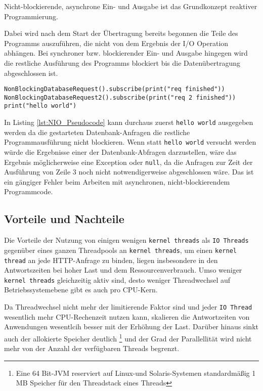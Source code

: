 Nicht-blockierende, asynchrone Ein- und Ausgabe ist das Grundkonzept reaktiver Programmierung.

Dabei wird nach dem Start der Übertragung bereits begonnen die Teile des Programms auszuführen, die nicht von dem Ergebnis der I/O Operation abhängen.
Bei synchroner bzw. blockierender Ein- und Ausgabe hingegen wird die restliche Ausführung des Programms blockiert
bis die Datenübertragung abgeschlossen ist.

\begin{lstlisting}[caption=Pseudocode Nonblocking I/O (NIO), captionpos=b, label=lst:NIO_Pseudocode]
NonBlockingDatabaseRequest().subscribe(print("req finished"))
NonBlockingDatabaseRequest2().subscribe(print("req 2 finished"))
print("hello world")
\end{lstlisting}
In Listing \ref{lst:NIO_Pseudocode} kann durchaus zuerst \verb|hello world| ausgegeben werden da die gestarteten Datenbank-Anfragen die
restliche Programmausführung nicht blockieren. Wenn statt \verb|hello world| versucht werden würde die Ergebnisse einer der Datenbank-Abfragen
darzustellen, wäre das Ergebnis möglicherweise eine Exception oder \verb|null|, da die Anfragen zur Zeit der Ausführung von Zeile 3 noch nicht notwendigerweise
abgeschlossen wäre. Das ist ein gängiger Fehler beim Arbeiten mit asynchronen, nicht-blockierendem Programmcode.

\subsection{Vorteile und Nachteile}
\label{subsec:vorteile_nachteile}

Die Vorteile der Nutzung von einigen wenigen \verb|kernel threads| als \verb|IO Threads| gegenüber eines ganzen Threadpools
an \verb|kernel threads|, um einen \verb|kernel thread| an jede HTTP-Anfrage zu binden, liegen insbesondere in den Antwortszeiten bei
hoher Last und dem Ressourcenverbrauch.
Umso weniger \verb|kernel threads| gleichzeitig aktiv sind, desto weniger Threadwechsel auf Betriebssystemebene
gibt es auch pro CPU-Kern.

Da Threadwechsel nicht mehr der limitierende Faktor sind und jeder \verb|IO Thread| wesentlich mehr CPU-Rechenzeit nutzen kann,
skalieren die Antwortzeiten von Anwendungen wesentlcih besser mit der Erhöhung der Last.
Darüber hinaus sinkt auch der allokierte Speicher deutlich
\footnote{Eine 64 Bit-JVM reserviert auf Linux-und Solaris-Systemen standardmäßig 1 MB Speicher für den Threadstack eines Threads}
und der Grad der Parallellität wird nicht mehr von der Anzahl der verfügbaren Threads begrenzt.


